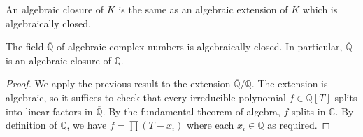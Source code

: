 \begin{remark}
	An algebraic closure of \( K \) is the same as an algebraic extension of \( K \) which is algebraically closed.
\end{remark}
\begin{corollary}
	The field \( \overline{\mathbb Q} \) of algebraic complex numbers is algebraically closed.
	In particular, \( \overline{\mathbb Q} \) is an algebraic closure of \( \mathbb Q \).
\end{corollary}
\begin{proof}
	We apply the previous result to the extension \( \overline{\mathbb Q} / \mathbb Q \).
	The extension is algebraic, so it suffices to check that every irreducible polynomial \( f \in \mathbb Q[T] \) splits into linear factors in \( \overline{\mathbb Q} \).
	By the fundamental theorem of algebra, \( f \) splits in \( \mathbb C \).
	By definition of \( \overline{\mathbb Q} \), we have \( f = \prod (T - x_i) \) where each \( x_i \in \overline{\mathbb Q} \) as required.
\end{proof}

